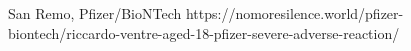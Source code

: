           {
            San Remo, 
          }
          {
          }
          {
            Pfizer/BioNTech
          }
          {
          }
          {
          }
          {
            https://nomoresilence.world/pfizer-biontech/riccardo-ventre-aged-18-pfizer-severe-adverse-reaction/
          }


